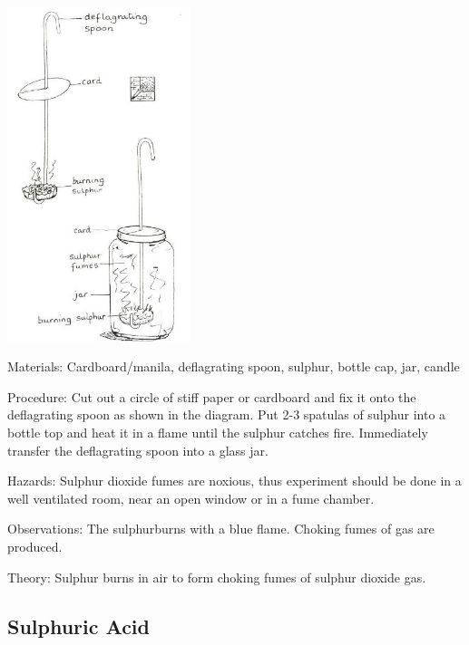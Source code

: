 \begin{multicols}{2}
\begin{center}
\includegraphics[width=0.4\textwidth]{./img/source/sulphur-dioxide.jpg}
\end{center}

\begin{description*}
\item[Materials:]{Cardboard/manila, deflagrating spoon, sulphur, bottle cap, jar, candle}
\item[Procedure:]{Cut out a circle of stiff paper or cardboard and
fix it onto the deflagrating spoon as shown in the
diagram. Put 2-3 spatulas of sulphur into a bottle
top and heat it in a flame until the sulphur
catches fire. Immediately transfer the
deflagrating spoon into a glass jar.}
\item[Hazards:]{Sulphur dioxide fumes are noxious, thus
experiment should be done in a well ventilated
room, near an open window or in a fume
chamber.}
\item[Observations:]{The sulphurburns with a blue flame. Choking
fumes of gas are produced.}
\item[Theory:]{Sulphur burns in air to form choking fumes
of sulphur dioxide gas.}
\end{description*}

\subsection{Sulphuric Acid} 


\end{multicols}
